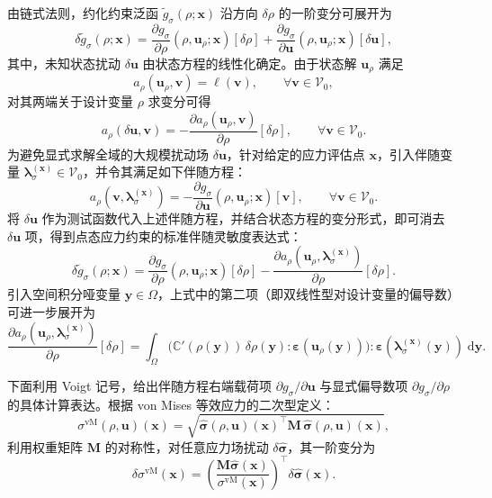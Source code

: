 由链式法则，约化约束泛函 $\tilde{g}_\sigma(\rho;\boldsymbol{x})$ 沿方向 $\delta\rho$ 的一阶变分可展开为
\[
\delta \tilde g_\sigma(\rho;\boldsymbol{x}) = \frac{\partial g_\sigma}{\partial \rho}(\rho,\boldsymbol{u}_\rho;\boldsymbol{x})[\delta\rho] + \frac{\partial g_\sigma}{\partial \boldsymbol{u}}(\rho,\boldsymbol{u}_\rho;\boldsymbol{x})[\delta\boldsymbol{u}],
\]
其中，未知状态扰动 $\delta\boldsymbol{u}$ 由状态方程的线性化确定。由于状态解 $\boldsymbol{u}_\rho$ 满足
\[
a_\rho(\boldsymbol{u}_\rho,\boldsymbol{v})=\ell(\boldsymbol{v}),\qquad \forall \boldsymbol{v}\in \mathcal{V}_0,
\]
对其两端关于设计变量 $\rho$ 求变分可得
\[
a_\rho(\delta\boldsymbol{u},\boldsymbol{v}) = -\frac{\partial a_\rho(\boldsymbol{u}_\rho,\boldsymbol{v})}{\partial \rho}[\delta\rho], \qquad \forall \boldsymbol{v}\in \mathcal{V}_0.
\]
为避免显式求解全域的大规模扰动场 $\delta\boldsymbol{u}$，针对给定的应力评估点 $\boldsymbol{x}$，引入伴随变量 $\boldsymbol{\lambda}_\sigma^{(\boldsymbol{x})}\in \mathcal{V}_0$，并令其满足如下伴随方程：
\begin{equation} \label{eq:ch2_stress_adjoint_equation}
	a_\rho(\boldsymbol{v},\boldsymbol{\lambda}_\sigma^{(\boldsymbol{x})}) = -\frac{\partial g_\sigma}{\partial \boldsymbol{u}}(\rho,\boldsymbol{u}_\rho;\boldsymbol{x})[\boldsymbol{v}], \qquad \forall \boldsymbol{v}\in \mathcal{V}_0.
\end{equation}
将 $\delta\boldsymbol{u}$ 作为测试函数代入上述伴随方程，并结合状态方程的变分形式，即可消去 $\delta\boldsymbol{u}$ 项，得到点态应力约束的标准伴随灵敏度表达式：
\begin{equation} \label{eq:ch2_stress_sensitivity_standard}
	\delta \tilde{g}_\sigma(\rho;\boldsymbol{x}) = \frac{\partial g_\sigma}{\partial \rho}(\rho,\boldsymbol{u}_\rho;\boldsymbol{x})[\delta\rho] - \frac{\partial a_\rho(\boldsymbol{u}_\rho,\boldsymbol{\lambda}_\sigma^{(\boldsymbol{x})})}{\partial \rho}[\delta\rho].
\end{equation}
引入空间积分哑变量 $\boldsymbol{y} \in \Omega$，上式中的第二项（即双线性型对设计变量的偏导数）可进一步展开为
\[
\frac{\partial a_\rho(\boldsymbol{u}_\rho,\boldsymbol{\lambda}_\sigma^{(\boldsymbol{x})})}{\partial \rho}[\delta\rho] = \int_{\Omega} \big(\mathbb{C}'(\rho(\boldsymbol{y}))\,\delta\rho(\boldsymbol{y}) : \boldsymbol{\varepsilon}(\boldsymbol{u}_\rho(\boldsymbol{y}))\big) : \boldsymbol{\varepsilon}(\boldsymbol{\lambda}_\sigma^{(\boldsymbol{x})}(\boldsymbol{y}))\; \mathrm{d}\boldsymbol{y}.
\]

下面利用 Voigt 记号，给出伴随方程右端载荷项 $\partial g_\sigma / \partial \boldsymbol{u}$ 与显式偏导数项 $\partial g_\sigma / \partial \rho$ 的具体计算表达。根据 von Mises 等效应力的二次型定义：
\[
\sigma^{\mathrm{vM}}(\rho,\boldsymbol{u})(\boldsymbol{x}) = \sqrt{ \hat{\boldsymbol{\sigma}}(\rho,\boldsymbol{u})(\boldsymbol{x})^{\top}\boldsymbol{M}\, \hat{\boldsymbol{\sigma}}(\rho,\boldsymbol{u})(\boldsymbol{x}) },
\]
利用权重矩阵 $\boldsymbol{M}$ 的对称性，对任意应力场扰动 $\delta\hat{\boldsymbol{\sigma}}$，其一阶变分为
\[
\delta\sigma^{\mathrm{vM}}(\boldsymbol{x}) = \left(\frac{\boldsymbol{M}\hat{\boldsymbol{\sigma}}(\boldsymbol{x})}{\sigma^{\mathrm{vM}}(\boldsymbol{x})}\right)^{\!\top}\delta\hat{\boldsymbol{\sigma}}(\boldsymbol{x}).
\]

